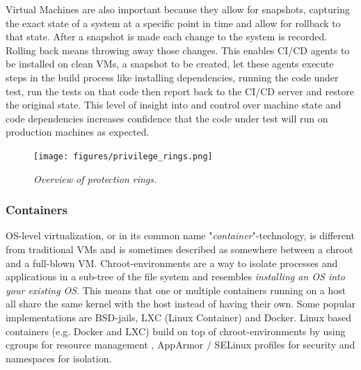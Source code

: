 Virtual Machines are also important because they allow for snapshots, capturing the exact state of a system at a specific point in time and allow for rollback to that state. After a snapshot is made each change to the system is recorded. Rolling back means throwing away those changes.\cite{virtualbox-snap} This enables CI/CD agents to be installed on clean VMs, a snapshot to be created, let these agents execute steps in the build process like installing dependencies, running the code under test, run the tests on that code then report back to the CI/CD server and restore the original state. This level of insight into and control over machine state and code dependencies increases confidence that the code under test will run on production machines as expected.

\begin{figure}[ht]
    \centering
    \texttt{[image: figures/privilege\_rings.png]}
    \caption{\textit{Overview of protection rings.}\cite{protection-rings}}
    \label{fig:protection-rings}
\end{figure}


\subsubsection{Containers}  \label{subsec:containers}
OS-level virtualization, or in its common name "\textit{container}"-technology, is different from traditional VMs and is sometimes described as somewhere between a chroot and a full-blown VM.\cite{lxc} Chroot-environments are a way to isolate processes and applications in a sub-tree of the file system and resembles \textit{installing an OS into your existing OS}.\cite{basic-chroot} This means that one or multiple containers running on a host all share the same kernel with the host instead of having their own. Some popular implementations are BSD-jails\cite{bsd-jail}, LXC\cite{arch-lxc} (Linux Container) and Docker\cite{arch-docker}. Linux based containers (e.g. Docker and LXC) build on top of chroot-environments by using cgroups for resource management \cite{arch-cgroups}, AppArmor / SELinux profiles for security \cite{lxc-intro} and namespaces for isolation.\cite{docker-namespace,evans-container}

\pagebreak

